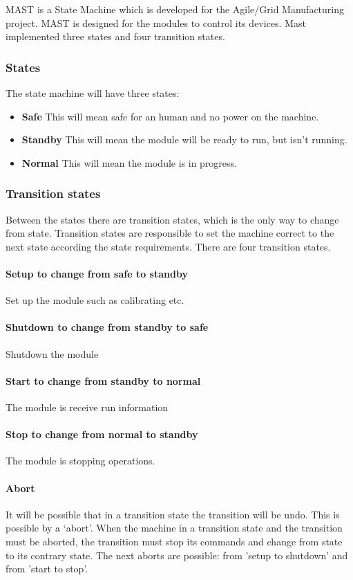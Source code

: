 \documentclass[12pt,a4paper]{report}
\begin{document}
MAST is a State Machine which is developed for the Agile/Grid Manufacturing project. MAST is designed for the modules to control its devices. Mast implemented three states and four transition states.

\subsubsection{States}
The state machine will have three states:
\begin{itemize}
\item \textbf{Safe} This will mean safe for an human and no power on the machine.
\item \textbf{Standby} This will mean the module will be ready to run, but isn’t running.
\item \textbf{Normal} This will mean the module is in progress.
\end{itemize}

\subsubsection{Transition states}
Between the states there are transition states, which is the only way to change from state. Transition states are responsible to set the machine correct to the next state according the state requirements.  
There are four transition states.
\paragraph{Setup to change from safe to standby}
Set up the module such as calibrating etc.
\paragraph{Shutdown to change from standby to safe}
Shutdown the module
\paragraph{Start to change from standby to normal}The module is receive run information
\paragraph{Stop to change from normal to standby}The module is stopping operations.

\paragraph{Abort}
It will be possible that in a transition state the transition will be undo. This is possible by a ‘abort’. When the machine in a transition state and the transition must be aborted, the transition must stop its commands and change from state to its contrary state. 
The next aborts are possible: from 'setup to shutdown' and from 'start to stop'. 
\end{document}
